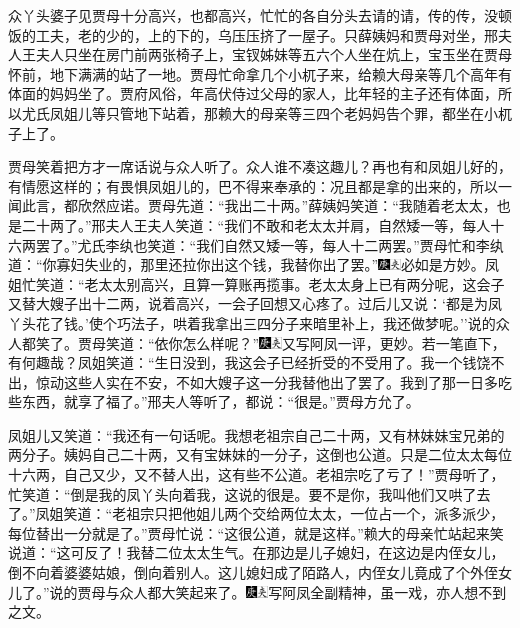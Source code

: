 众丫头婆子见贾母十分高兴，也都高兴，忙忙的各自分头去请的请，传的传，没顿饭的工夫，老的少的，上的下的，乌压压挤了一屋子。只薛姨妈和贾母对坐，邢夫人王夫人只坐在房门前两张椅子上，宝钗姊妹等五六个人坐在炕上，宝玉坐在贾母怀前，地下满满的站了一地。贾母忙命拿几个小杌子来，给赖大母亲等几个高年有体面的妈妈坐了。贾府风俗，年高伏侍过父母的家人，比年轻的主子还有体面，所以尤氏凤姐儿等只管地下站着，那赖大的母亲等三四个老妈妈告个罪，都坐在小杌子上了。

贾母笑着把方才一席话说与众人听了。众人谁不凑这趣儿？再也有和凤姐儿好的，有情愿这样的；有畏惧凤姐儿的，巴不得来奉承的：况且都是拿的出来的，所以一闻此言，都欣然应诺。贾母先道：``我出二十两。''薛姨妈笑道：``我随着老太太，也是二十两了。''邢夫人王夫人笑道：``我们不敢和老太太并肩，自然矮一等，每人十六两罢了。''尤氏李纨也笑道：``我们自然又矮一等，每人十二两罢。''贾母忙和李纨道：``你寡妇失业的，那里还拉你出这个钱，我替你出了罢。''{\includegraphics[width=3mm]{../Images/00004}\includegraphics[width=3mm]{../Images/00012}\footnotesize \kaishu 必如是方妙。}凤姐忙笑道：``老太太别高兴，且算一算账再揽事。老太太身上已有两分呢，这会子又替大嫂子出十二两，说着高兴，一会子回想又心疼了。过后儿又说：`都是为凤丫头花了钱。'使个巧法子，哄着我拿出三四分子来暗里补上，我还做梦呢。''说的众人都笑了。贾母笑道：``依你怎么样呢？''{\includegraphics[width=3mm]{../Images/00004}\includegraphics[width=3mm]{../Images/00012}\footnotesize \kaishu 又写阿凤一评，更妙。若一笔直下，有何趣哉？}凤姐笑道：``生日没到，我这会子已经折受的不受用了。我一个钱饶不出，惊动这些人实在不安，不如大嫂子这一分我替他出了罢了。我到了那一日多吃些东西，就享了福了。''邢夫人等听了，都说：``很是。''贾母方允了。

凤姐儿又笑道：``我还有一句话呢。我想老祖宗自己二十两，又有林妹妹宝兄弟的两分子。姨妈自己二十两，又有宝妹妹的一分子，这倒也公道。只是二位太太每位十六两，自己又少，又不替人出，这有些不公道。老祖宗吃了亏了！''贾母听了，忙笑道：``倒是我的凤丫头向着我，这说的很是。要不是你，我叫他们又哄了去了。''凤姐笑道：``老祖宗只把他姐儿两个交给两位太太，一位占一个，派多派少，每位替出一分就是了。''贾母忙说：``这很公道，就是这样。''赖大的母亲忙站起来笑说道：``这可反了！我替二位太太生气。在那边是儿子媳妇，在这边是内侄女儿，倒不向着婆婆姑娘，倒向着别人。这儿媳妇成了陌路人，内侄女儿竟成了个外侄女儿了。''说的贾母与众人都大笑起来了。{\includegraphics[width=3mm]{../Images/00004}\includegraphics[width=3mm]{../Images/00012}\footnotesize \kaishu 写阿凤全副精神，虽一戏，亦人想不到之文。}

